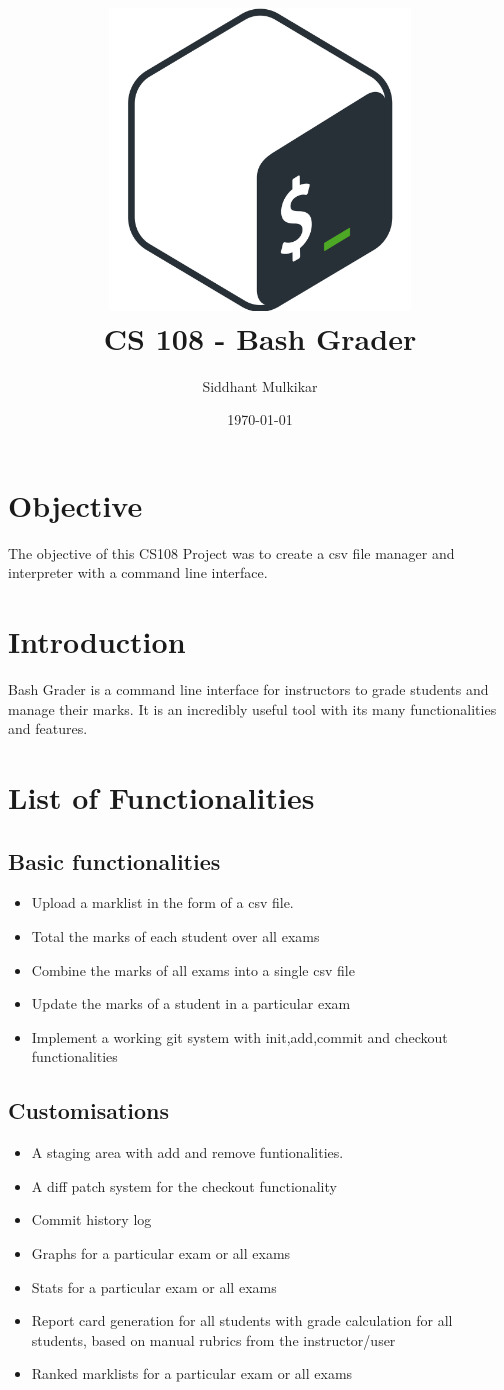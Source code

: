 \documentclass{article}
\title{\includegraphics[width=8cm]{bashlogo.png} \\[2cm] CS 108 - Bash Grader}
\author{Siddhant Mulkikar}
\date{\today}
\begin{document}
\maketitle
\newpage
\tableofcontents
\newpage

\section{Objective}
The objective of this CS108 Project was to create a csv file manager and interpreter with a command line interface.

\section{Introduction}
Bash Grader is a command line interface for instructors to grade students and manage their marks. It is an incredibly useful tool with its many functionalities and features. 

\section{List of Functionalities}
\subsection{Basic functionalities}
\begin{itemize}
    \item Upload a marklist in the form of a csv file.
    \item Total the marks of each student over all exams
    \item Combine the marks of all exams into a single csv file
    \item Update the marks of a student in a particular exam
    \item Implement a working git system with init,add,commit and checkout functionalities
\end{itemize}
\subsection{Customisations}
\begin{itemize}
    \item A staging area with add and remove funtionalities.
    \item A diff patch system for the checkout functionality
    \item Commit history log
    \item Graphs for a particular exam or all exams
    \item Stats for a particular exam or all exams
    \item Report card generation for all students with grade calculation for all students, based on manual rubrics from the instructor/user
    \item Ranked marklists for a particular exam or all exams
\end{itemize}
\newpage
\end{document}
